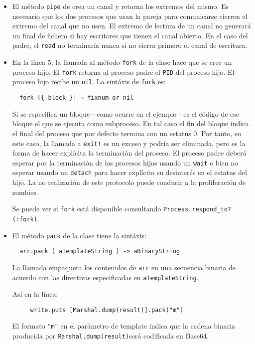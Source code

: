 \begin{itemize}
\item
El método \verb|pipe| de  crea un canal y retorna los extremos del mismo.
Es necesario que los dos procesos que usan la pareja para comunicarse cierren el extremo 
del canal que no usen. El extremo de lectura de un canal no generará un
final de fichero si hay escritores que tienen el canal abierto.
En el caso del padre, el \verb|read| no terminaría nunca 
si no cierra primero el canal de escritura.
%
%
\item En la línea 5, la llamada al método \verb|fork| de la clase  
hace que se cree un proceso hijo.
El \verb|fork| retorna al proceso padre el \verb|PID| del proceso hijo.
El proceso hijo recibe un \verb|nil|.
La sintáxis de \verb|fork| es:
\begin{verbatim}
  fork [{ block }] → fixnum or nil 
\end{verbatim}

Si se especifica un bloque - como ocurre en el ejemplo -
es el código de ese bloque el que se ejecuta como subproceso. En tal caso
el fin del bloque indica el final del proceso que por defecto termina con un estatus 0.
Por tanto, en este caso, la llamada a \verb|exit!| es un exceso y podría ser eliminada, pero es la forma de 
hacer explícita la terminación del proceso.
El proceso padre deberá esperar por la terminación de los procesos hijos usando un \verb|wait|
o bien no esperar usando un \verb|detach| para hacer explícito su desinterés en el estatus del hijo.
La no realización de este protocolo puede conducir a la proliferación de zombies.

Se puede ver si \verb|fork| está disponible consultando  \verb|Process.respond_to?(:fork)|.
\item
El método \verb|pack| de la clase 
 tiene la sintáxis:
\begin{verbatim}
  arr.pack ( aTemplateString ) -> aBinaryString
\end{verbatim}
La llamada empaqueta los contenidos de \verb|arr| en una secuencia 
binaria de acuerdo con las directivas especificadas en
\verb|aTemplateString|. 

Así en la línea:
\begin{verbatim}
     write.puts [Marshal.dump(result)].pack("m")
\end{verbatim}
El formato \verb|"m"| en el parámetro de template indica que la cadena binaria producida por 
\verb|Marshal.dump(result)|será codificada en Base64.


\end{itemize}
